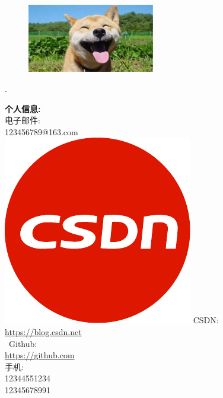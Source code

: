\documentclass[a4paper,12pt,final,UTF8,fontset=macnew]{memoir}
\newcommand{\myThemeColor}{RoyalBlue}
\newcommand{\CVItem}[1]
    {\textbf{\color{\myThemeColor} #1}}
\begin{document}
\linespread{1.15}\selectfont
\begin{figure}
\centering
    \includegraphics[width=0.8\columnwidth,height=3cm]{ha.jpg}
\vspace{-7cm}
\end{figure}
\begin{flushright}\footnotesize
.\\
\vskip 6cm
    \raggedright
    \CVItem{{\large \faInfoCircle 个人信息:}}\\[1em]
    {            
    \textcolor{blue}{\faEnvelope} 电子邮件:\\
    123456789@163.com \\                    %
     \includegraphics[scale=0.07]{csdn.pdf} \hspace{-0.2em} CSDN:\\    
     \href{https://blog.csdn.net}{\small https://blog.csdn.net} \\    %
    \faGithub  \ Github:\\
    \href{https://github.com}{\small https://github.com}   \\            %
    \textcolor{red}{\faPhone}手机:\\                            %
    12344551234\\
    12345678991 \\ }


\end{flushright}
\end{document}
